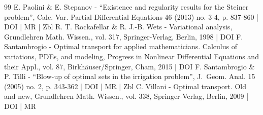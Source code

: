 \begin{thebibliography}{99}
E. Paolini \& E. Stepanov - “Existence and regularity results for the Steiner problem”, Calc. Var. Partial Differential Equations 46 (2013) no. 3-4, p. 837-860 | DOI | MR | Zbl
R. T. Rockafellar \& R. J.-B. Wets - Variational analysis, Grundlehren Math. Wissen., vol. 317, Springer-Verlag, Berlin, 1998 | DOI
F. Santambrogio - Optimal transport for applied mathematicians. Calculus of variations, PDEs, and modeling, Progress in Nonlinear Differential Equations and their Appl., vol. 87, Birkhäuser/Springer, Cham, 2015 | DOI
F. Santambrogio \& P. Tilli - “Blow-up of optimal sets in the irrigation problem”, J. Geom. Anal. 15 (2005) no. 2, p. 343-362 | DOI | MR | Zbl
C. Villani - Optimal transport. Old and new, Grundlehren Math. Wissen., vol. 338, Springer-Verlag, Berlin, 2009 | DOI | MR
\end{thebibliography}
